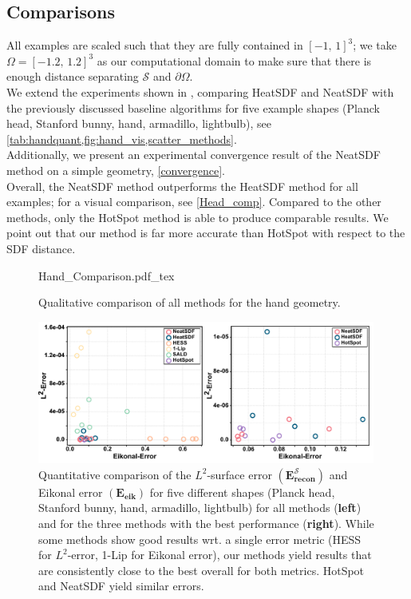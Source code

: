 \documentclass[12pt,openany]{book}
\theoremstyle{plainnormal}
\theoremstyle{remark}
\begin{document}
\subsection{Comparisons}
All examples are scaled such that they are fully contained in $[-1,\,1]^3$; we take $\Omega = [-1.2, \,1.2]^3$ as our computational domain to make sure that there is enough distance separating $\mathcal S$ and $\partial \Omega$. \\
We extend the experiments shown in \cite{weidemaier2025sdfsunorientedpointclouds}, comparing HeatSDF and NeatSDF with the previously discussed baseline algorithms for five example shapes (Planck head, Stanford bunny, hand, armadillo, lightbulb), see \cref{tab:handquant,fig:hand_vis,scatter_methods}. \\
Additionally, we present an experimental convergence result of the NeatSDF method on a simple geometry, \cref{convergence}. \\
Overall, the NeatSDF method outperforms the HeatSDF method for all examples; for a visual comparison, see \cref{Head_comp}. Compared to the other methods, only the HotSpot method is able to produce comparable results. We point out that our method is far more accurate than HotSpot with respect to the SDF distance.
\begin{figure}[t]
    \centering
    \begingroup
    \sffamily
    \def\svgwidth{0.95\textwidth}
    {Hand_Comparison.pdf_tex}
    \endgroup
    \caption{Qualitative comparison of all methods for the hand geometry.}
    \label{fig:hand_vis}
\end{figure}
\begin{figure}[b]
    \centering
    \includegraphics[width =0.99\textwidth]{Figures/method_comparison_lager_letters.pdf}
    
   
    \caption{Quantitative comparison of the $L^2$-surface error $\mathbf{(E_{recon}^{\mathcal{S}})}$ and Eikonal error $\mathbf{(E_{\text{eik}})}$ for five different shapes (Planck head, Stanford bunny, hand, armadillo, lightbulb) for all methods (\textbf{left}) and for the three methods with the best performance (\textbf{right}). While some methods show good results wrt. a single error metric (HESS for $L^2$-error, 1-Lip for Eikonal error), our methods yield results that are consistently close to the best overall for both metrics. HotSpot and NeatSDF yield similar errors.}  \label{scatter_methods}
\end{figure}
\end{document}
